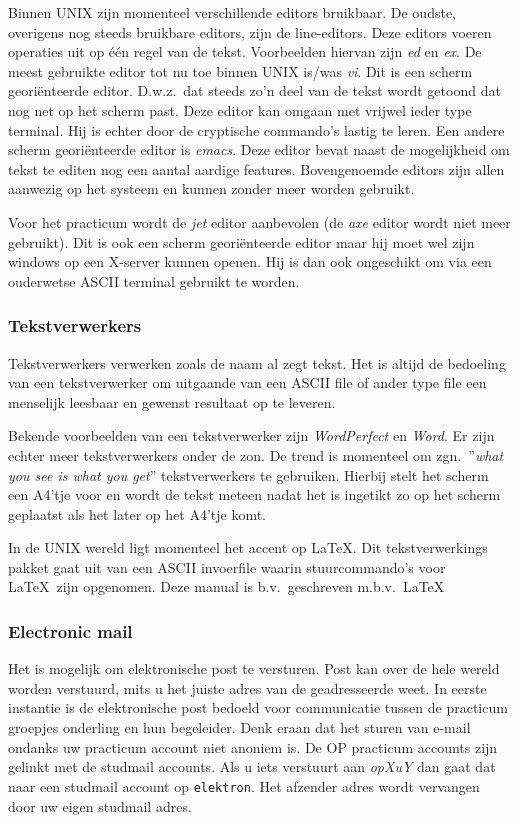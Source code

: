 Binnen UNIX zijn momenteel verschillende editors bruikbaar.
De oudste, overigens nog steeds bruikbare editors, zijn de 
line-editors. Deze editors voeren operaties uit op \'e\'en regel van de tekst.
Voorbeelden hiervan zijn {\em ed} en {\em ex}.
De meest gebruikte editor tot nu toe binnen UNIX is/was {\em vi}.
Dit is een scherm geori\"enteerde editor.
D.w.z.\ dat steeds zo'n deel van de tekst wordt getoond dat nog
net op het scherm past.  Deze editor kan omgaan
met vrijwel ieder type terminal. Hij is echter door de cryptische 
commando's lastig te leren.
Een andere scherm geori\"enteerde editor is {\em emacs}.
Deze editor bevat naast de mogelijkheid om tekst te editen
nog een aantal aardige features.
Bovengenoemde editors zijn allen aanwezig op het systeem en 
kunnen zonder meer worden gebruikt.

Voor het practicum wordt de {\em jet} editor aanbevolen
(de {\em axe} editor wordt niet meer gebruikt).
Dit is ook een scherm geori\"enteerde editor maar hij moet
wel zijn windows op een X-server kunnen openen.
Hij is dan ook ongeschikt om via een ouderwetse ASCII terminal gebruikt te
worden.

\subsubsection{Tekstverwerkers}
Tekstverwerkers verwerken zoals de naam al zegt tekst.
Het is altijd de bedoeling van een tekstverwerker om uitgaande
van een ASCII file of ander type file een 
menselijk leesbaar en gewenst resultaat op te leveren.

Bekende voorbeelden van een tekstverwerker zijn {\em WordPerfect} en {\em Word}.
Er zijn echter meer tekstverwerkers onder de zon.
De trend is momenteel om zgn.\ ''{\em what you see is what you get}''
tekstverwerkers te gebruiken. Hierbij stelt het scherm een A4'tje voor
en wordt de tekst meteen nadat het is ingetikt zo op het scherm geplaatst
als het later op het A4'tje komt.

In de UNIX wereld ligt momenteel het accent op \LaTeX.
Dit tekstverwerkings pakket gaat uit van een ASCII invoerfile
waarin stuurcommando's voor \LaTeX~zijn opgenomen.
Deze manual is b.v.\ geschreven m.b.v.\ \LaTeX~

\subsubsection{Electronic mail}
\label{domeinnamen}
Het is mogelijk om elektronische post te versturen.
Post kan over de hele wereld worden verstuurd,
mits u het juiste adres van de geadresseerde weet.
In eerste instantie is de elektronische post
bedoeld voor communicatie tussen de practicum groepjes onderling en
hun begeleider.
Denk eraan dat het sturen van e-mail ondanks uw
practicum account niet anoniem is.
De OP practicum accounts zijn
gelinkt met de studmail accounts.
Als u iets verstuurt aan {\em opXuY} dan
gaat dat naar een studmail account op {\tt elektron}.
Het afzender adres wordt vervangen door uw eigen studmail adres.

